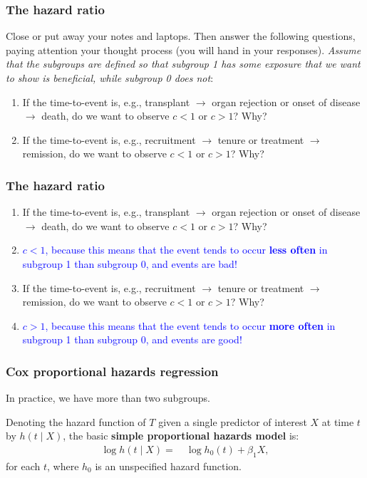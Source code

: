 \documentclass[12pt, 
hyperref={colorlinks=true, linkcolor=blue, urlcolor=cyan},dvipsnames]{beamer}
\begin{document}
\begin{frame}
\frametitle{The hazard ratio}
Close or put away your notes and laptops. Then answer the following questions, paying attention your thought process (you will hand in your responses). \textit{Assume that the subgroups are defined so that subgroup 1 has some exposure that we want to show is beneficial, while subgroup 0 does not}:

\begin{enumerate}
\item If the time-to-event is, e.g., transplant $\rightarrow$ organ rejection or onset of disease $\rightarrow$ death, do we want to observe $c < 1$ or $c > 1$? Why?
\item If the time-to-event is, e.g., recruitment $\rightarrow$ tenure or treatment $\rightarrow$ remission, do we want to observe $c < 1$ or $c > 1$? Why?
\end{enumerate}
\end{frame}

\begin{frame}
\frametitle{The hazard ratio}
\begin{enumerate}
\item If the time-to-event is, e.g., transplant $\rightarrow$ organ rejection or onset of disease $\rightarrow$ death, do we want to observe $c < 1$ or $c > 1$? Why?
\item[] \textcolor{blue}{$c < 1$, because this means that the event tends to occur \textbf{less often} in subgroup 1 than subgroup 0, and events are bad!}
\item If the time-to-event is, e.g., recruitment $\rightarrow$ tenure or treatment $\rightarrow$ remission, do we want to observe $c < 1$ or $c > 1$? Why?
\item[] \textcolor{blue}{$c > 1$, because this means that the event tends to occur \textbf{more often} in subgroup 1 than subgroup 0, and events are good!}
\end{enumerate}
\end{frame}

\begin{frame}
\frametitle{Cox proportional hazards regression}
In practice, we have more than two subgroups. 

Denoting the hazard function of $T$ given a single predictor of interest $X$ at time $t$ by $h(t \mid X)$, the basic \textbf{simple proportional hazards model} is:
\begin{align*}
\log h(t \mid X) = & \ \log h_0(t) + \beta_1 X,
\end{align*}
for each $t$, where $h_0$ is an unspecified hazard function.

\end{frame}
\end{document}
